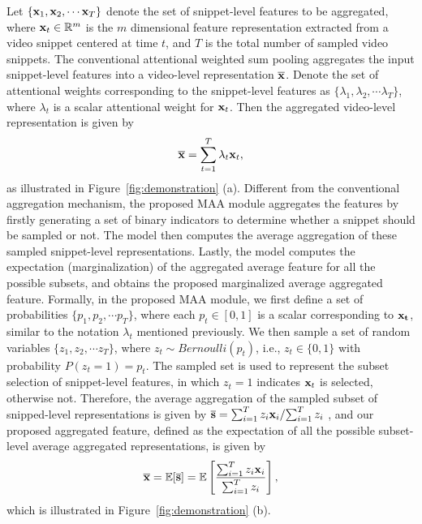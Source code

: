 \documentclass{article} \usepackage{iclr2019_conference,times}
\begin{document}
Let $\{{\bf{x}}_1,{\bf x}_2,\cdots {\bf{x}}_T\}$ denote the set of snippet-level features to be aggregated, where ${\bf x}_t \in  \mathbb{R}^m$ is the $ m $ dimensional feature representation extracted from a video snippet centered at time $ t $, and $ T $ is the total number of sampled video snippets. 
The conventional attentional weighted sum pooling aggregates the input snippet-level features into a video-level representation $\overline{\bf{x}}$. Denote the set of attentional weights corresponding to the snippet-level features as $\{\lambda_{1}, \lambda_{2}, \cdots \lambda_{T}\}$, where $\lambda_{t} $ is a scalar attentional weight for $ {\bf x}_t $. Then the aggregated video-level representation is given by
\begin{equation}
\label{x1}
\overline{\bf{x}} = \sum_{t=1}^{T}\lambda_{t}{\bf x}_t,
\end{equation}
as illustrated in Figure~\ref{fig:demonstration} (a). Different from the conventional aggregation mechanism, the proposed MAA module aggregates the features by firstly generating a set of binary indicators to determine whether a snippet should be sampled or not. The model then computes the average aggregation of these sampled snippet-level representations. Lastly, the model computes the expectation (marginalization) of the aggregated average feature for all the possible subsets, and obtains the proposed marginalized average aggregated feature.
Formally, in the proposed MAA module, we first define a set of probabilities $ \{p_{1}, p_{2}, \cdots p_{T}\}$, where each $ p_{t} \in [0,1] $ is a scalar corresponding to $ \bf x_{t} $, similar to the notation $ \lambda_{t} $ mentioned previously. We then sample a set of random variables $ \{z_{1}, z_{2}, \cdots z_{T}\}$, where $ z_{t} \sim Bernoulli(p_{t}) $, i.e., $z_{t} \in \{0,1\}$ with probability $ P(z_{t}=1) = p_{t}$. The sampled set is used to represent the subset selection of snippet-level features, in which $ z_{t}=1 $ indicates ${\bf x}_t $ is selected, otherwise not. Therefore, the average aggregation of the sampled subset of snipped-level representations is given by  $\overline{\bf{s}} = \sum\nolimits_{i = 1} ^T {{z_i}{{\bf{x}}_i}}/{\sum\nolimits_{i = 1}^T {{z_i}}}$ ,
and our proposed aggregated feature, defined as the expectation of all the possible subset-level average aggregated representations, is given by
\begin{equation}
\label{xbar}
\overline{\bf{x}} = \mathbb{E} [\overline{\bf{s}}]= \mathbb{E}\left[ \frac{\sum\nolimits_{i = 1} ^T {{z_i}{{\bf{x}}_i}}}{\sum\nolimits_{i = 1}^T {{z_i}}} \right],
\end{equation}
which is illustrated in Figure~\ref{fig:demonstration} (b).
\end{document}
